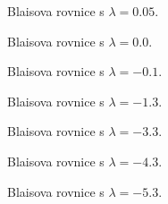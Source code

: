 \documentclass[landscape]{article}
\begin{document}
\begin{figure}[h]
	\centering
	\def\svgwidth{\textwidth}
	
	\caption{Blaisova rovnice s $\lambda = 0.05$.}
\end{figure}

\begin{figure}[h]
	\centering
	\def\svgwidth{\textwidth}
	
	\caption{Blaisova rovnice s $\lambda = 0.0$.}
\end{figure}

\begin{figure}[h]
	\centering
	\def\svgwidth{\textwidth}
	
	\caption{Blaisova rovnice s $\lambda = -0.1$.}
\end{figure}

\begin{figure}[h]
	\centering
	\def\svgwidth{\textwidth}
	
	\caption{Blaisova rovnice s $\lambda = -1.3$.}
\end{figure}

\begin{figure}[h]
	\centering
	\def\svgwidth{\textwidth}
	
	\caption{Blaisova rovnice s $\lambda = -3.3$.}
\end{figure}

\begin{figure}[h]
	\centering
	\def\svgwidth{\textwidth}
	
	\caption{Blaisova rovnice s $\lambda = -4.3$.}
\end{figure}

\begin{figure}[h]
	\centering
	\def\svgwidth{\textwidth}
	
	\caption{Blaisova rovnice s $\lambda = -5.3$.}
\end{figure}
\end{document}
